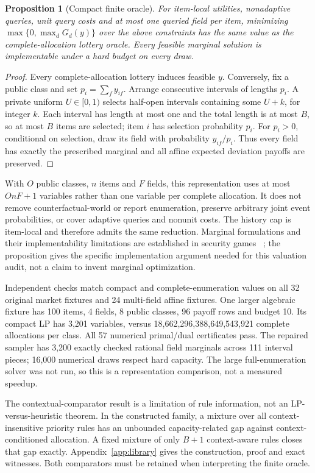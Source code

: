 \documentclass[11pt]{article}
\newtheorem{proposition}{Proposition}
\begin{document}
\begin{proposition}[Compact finite oracle]
For item-local utilities, nonadaptive queries, unit query costs and at most one
queried field per item, minimizing $\max\{0,\max_d G_d(y)\}$ over the above
constraints has the same value as the complete-allocation lottery oracle.
Every feasible marginal solution is implementable under a hard budget on every draw.
\end{proposition}
\begin{proof}
Every complete-allocation lottery induces feasible $y$. Conversely, fix a
public class and set $p_i=\sum_f y_{if}$. Arrange consecutive intervals of lengths
$p_i$. A private uniform $U\in[0,1)$ selects half-open intervals containing some $U+k$,
for integer $k$. Each interval has length at most one and the total length is
at most $B$, so at most $B$ items are selected; item $i$ has selection probability
$p_i$. For $p_i>0$, conditional on selection, draw its field with probability $y_{if}/p_i$.
Thus every field has exactly the prescribed marginal and all affine expected
deviation payoffs are preserved.\end{proof}

With $O$ public classes, $n$ items and $F$ fields, this representation uses at
most $OnF+1$ variables rather than one variable per complete allocation. It does
not remove counterfactual-world or report enumeration, preserve arbitrary joint
event probabilities, or cover adaptive queries and nonunit costs. The history
cap is item-local and therefore admits the same reduction. Marginal formulations
and their implementability limitations are established in security games
~\cite{marginals}; the proposition gives the specific implementation argument
needed for this valuation audit, not a claim to invent marginal optimization.

Independent checks match compact and complete-enumeration values on all 32 original
market fixtures and 24 multi-field affine fixtures. One larger algebraic fixture
has 100 items, 4 fields, 8 public classes, 96 payoff rows and budget 10. Its compact
LP has 3,201 variables, versus 18,662,296,388,649,543,921 complete allocations
per class. All 57 numerical primal/dual certificates pass. The repaired sampler
has 3,200 exactly checked rational field marginals across 111 interval pieces;
16,000 numerical draws respect hard capacity. The large full-enumeration solver
was not run, so this is a representation comparison, not a measured speedup.


The contextual-comparator result is a limitation of rule information, not an
LP-versus-heuristic theorem. In the constructed family, a mixture over all
context-insensitive priority rules has an unbounded capacity-related gap against
context-conditioned allocation. A fixed mixture of only $B+1$ context-aware
rules closes that gap exactly. Appendix~\ref{app:library} gives the construction,
proof and exact witnesses. Both comparators must be retained when interpreting
the finite oracle.
\end{document}
